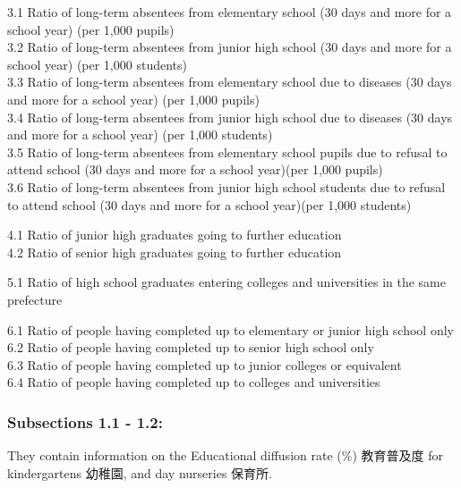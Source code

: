 \documentclass[
]{ltjarticle}
\begin{document}
3.1 Ratio of long-term absentees from elementary school (30 days and
more for a school year) (per 1,000 pupils)\\
3.2 Ratio of long-term absentees from junior high school (30 days and
more for a school year) (per 1,000 students)\\
3.3 Ratio of long-term absentees from elementary school due to diseases
(30 days and more for a school year) (per 1,000 pupils)\\
3.4 Ratio of long-term absentees from junior high school due to diseases
(30 days and more for a school year) (per 1,000 students)\\
3.5 Ratio of long-term absentees from elementary school pupils due to
refusal to attend school (30 days and more for a school year)(per 1,000
pupils)\\
3.6 Ratio of long-term absentees from junior high school students due to
refusal to attend school (30 days and more for a school year)(per 1,000
students)

4.1 Ratio of junior high graduates going to further education\\
4.2 Ratio of senior high graduates going to further education

5.1 Ratio of high school graduates entering colleges and universities in
the same prefecture

6.1 Ratio of people having completed up to elementary or junior high
school only\\
6.2 Ratio of people having completed up to senior high school only\\
6.3 Ratio of people having completed up to junior colleges or
equivalent\\
6.4 Ratio of people having completed up to colleges and universities

\hypertarget{subsections-1.1---1.2-3}{%
\subsubsection{Subsections 1.1 - 1.2:}\label{subsections-1.1---1.2-3}}

They contain information on the Educational diffusion rate (\%)
教育普及度 for kindergartens 幼稚園, and day nurseries 保育所.
\end{document}
